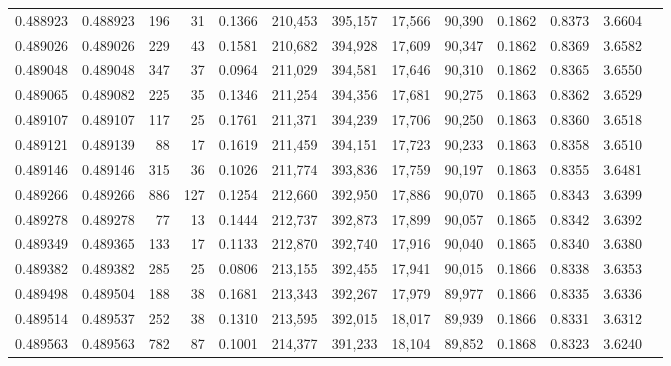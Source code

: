 \begin{tabular}{rrrrrrrrrrrrr}
0.488923 & 0.488923 &   196 &    31 &                                     0.1366 & 210,453 & 395,157 &  17,566 &  90,390 & 0.1862 & 0.8373 & 3.6604 \\
0.489026 & 0.489026 &   229 &    43 &                                     0.1581 & 210,682 & 394,928 &  17,609 &  90,347 & 0.1862 & 0.8369 & 3.6582 \\
0.489048 & 0.489048 &   347 &    37 &                                     0.0964 & 211,029 & 394,581 &  17,646 &  90,310 & 0.1862 & 0.8365 & 3.6550 \\
0.489065 & 0.489082 &   225 &    35 &                                     0.1346 & 211,254 & 394,356 &  17,681 &  90,275 & 0.1863 & 0.8362 & 3.6529 \\
0.489107 & 0.489107 &   117 &    25 &                                     0.1761 & 211,371 & 394,239 &  17,706 &  90,250 & 0.1863 & 0.8360 & 3.6518 \\
0.489121 & 0.489139 &    88 &    17 &                                     0.1619 & 211,459 & 394,151 &  17,723 &  90,233 & 0.1863 & 0.8358 & 3.6510 \\
0.489146 & 0.489146 &   315 &    36 &                                     0.1026 & 211,774 & 393,836 &  17,759 &  90,197 & 0.1863 & 0.8355 & 3.6481 \\
0.489266 & 0.489266 &   886 &   127 &                                     0.1254 & 212,660 & 392,950 &  17,886 &  90,070 & 0.1865 & 0.8343 & 3.6399 \\
0.489278 & 0.489278 &    77 &    13 &                                     0.1444 & 212,737 & 392,873 &  17,899 &  90,057 & 0.1865 & 0.8342 & 3.6392 \\
0.489349 & 0.489365 &   133 &    17 &                                     0.1133 & 212,870 & 392,740 &  17,916 &  90,040 & 0.1865 & 0.8340 & 3.6380 \\
0.489382 & 0.489382 &   285 &    25 &                                     0.0806 & 213,155 & 392,455 &  17,941 &  90,015 & 0.1866 & 0.8338 & 3.6353 \\
0.489498 & 0.489504 &   188 &    38 &                                     0.1681 & 213,343 & 392,267 &  17,979 &  89,977 & 0.1866 & 0.8335 & 3.6336 \\
0.489514 & 0.489537 &   252 &    38 &                                     0.1310 & 213,595 & 392,015 &  18,017 &  89,939 & 0.1866 & 0.8331 & 3.6312 \\
0.489563 & 0.489563 &   782 &    87 &                                     0.1001 & 214,377 & 391,233 &  18,104 &  89,852 & 0.1868 & 0.8323 & 3.6240 \\

\end{tabular}
